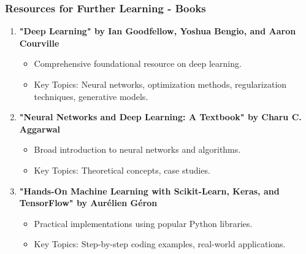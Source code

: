 \documentclass[aspectratio=169]{beamer}
\begin{document}
\begin{frame}[fragile]
    \frametitle{Resources for Further Learning - Books}
    \begin{enumerate}
        \item \textbf{"Deep Learning" by Ian Goodfellow, Yoshua Bengio, and Aaron Courville}
        \begin{itemize}
            \item Comprehensive foundational resource on deep learning.
            \item Key Topics: Neural networks, optimization methods, regularization techniques, generative models.
        \end{itemize}
        
        \item \textbf{"Neural Networks and Deep Learning: A Textbook" by Charu C. Aggarwal}
        \begin{itemize}
            \item Broad introduction to neural networks and algorithms.
            \item Key Topics: Theoretical concepts, case studies.
        \end{itemize}
        
        \item \textbf{"Hands-On Machine Learning with Scikit-Learn, Keras, and TensorFlow" by Aurélien Géron}
        \begin{itemize}
            \item Practical implementations using popular Python libraries.
            \item Key Topics: Step-by-step coding examples, real-world applications.
        \end{itemize}
    \end{enumerate}
\end{frame}
\end{document}
